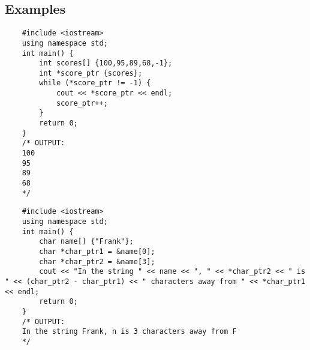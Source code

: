 \subsection{Examples}
\begin{verbatim}
    #include <iostream>
    using namespace std;
    int main() {
        int scores[] {100,95,89,68,-1};
        int *score_ptr {scores};
        while (*score_ptr != -1) {
            cout << *score_ptr << endl;
            score_ptr++;
        }
        return 0;
    }
    /* OUTPUT:
    100
    95
    89
    68
    */
\end{verbatim}

\begin{verbatim}
    #include <iostream>
    using namespace std;
    int main() {
        char name[] {"Frank"};
        char *char_ptr1 = &name[0];
        char *char_ptr2 = &name[3];
        cout << "In the string " << name << ", " << *char_ptr2 << " is " << (char_ptr2 - char_ptr1) << " characters away from " << *char_ptr1 << endl;
        return 0;
    }
    /* OUTPUT:
    In the string Frank, n is 3 characters away from F
    */
\end{verbatim}
